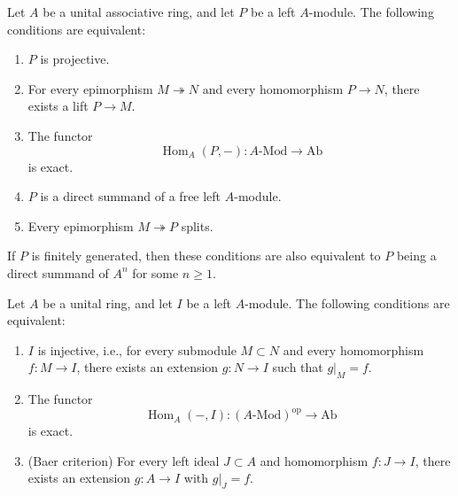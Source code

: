 \begin{theorem}
\label{thm:projective-module-characterizations}
Let \(A\) be a unital associative ring, and let \(P\) be a left
\(A\)-module. The following conditions are equivalent:
\begin{enumerate}
    \item[(i)] \(P\) is projective.

    \item[(ii)] For every epimorphism \(M\twoheadrightarrow N\) and every
    homomorphism \(P\to N\), there exists a lift \(P\to M\).

    \item[(iii)] The functor
    \[
    \operatorname{Hom}_A(P,-):A\text{-}\mathrm{Mod}\longrightarrow
    \mathrm{Ab}
    \]
    is exact.

    \item[(iv)] \(P\) is a direct summand of a free left \(A\)-module.

    \item[(v)] Every epimorphism \(M\twoheadrightarrow P\) splits.
\end{enumerate}
If \(P\) is finitely generated, then these conditions are also equivalent to
\(P\) being a direct summand of \(A^n\) for some \(n\geq 1\).
\end{theorem}

\begin{theorem}
\label{thm:injective-module-characterizations}
Let \(A\) be a unital ring, and let \(I\) be a left \(A\)-module. The following
conditions are equivalent:
\begin{enumerate}
    \item[(i)] \(I\) is injective, i.e., for every submodule \(M\subset N\) and
    every homomorphism \(f:M\to I\), there exists an extension \(g:N\to I\)
    such that \(g|_M=f\).

    \item[(ii)] The functor
    \[
    \operatorname{Hom}_A(-,I):(A\text{-Mod})^{\mathrm{op}}\longrightarrow
    \mathrm{Ab}
    \]
    is exact.

    \item[(iii)] (Baer criterion) For every left ideal \(J\subset A\) and
    homomorphism \(f:J\to I\), there exists an extension \(g:A\to I\)
    with \(g|_J=f\).
\end{enumerate}
\end{theorem}


